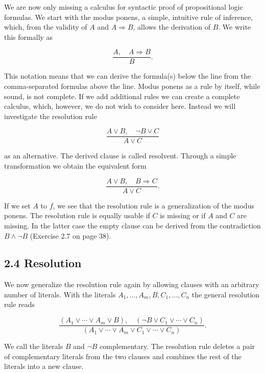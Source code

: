 \documentclass[10pt]{article}
\begin{document}
We are now only missing a calculus for syntactic proof of propositional logic formulas. We start with the modus ponens, a simple, intuitive rule of inference, which, from the validity of $A$ and $A \Rightarrow B$, allows the derivation of $B$. We write this formally as

$$
\frac{A, \quad A \Rightarrow B}{B} .
$$

This notation means that we can derive the formula(s) below the line from the comma-separated formulas above the line. Modus ponens as a rule by itself, while sound, is not complete. If we add additional rules we can create a complete calculus, which, however, we do not wish to consider here. Instead we will investigate the resolution rule


\begin{equation*}
\frac{A \vee B, \quad \neg B \vee C}{A \vee C} \tag{2.1}
\end{equation*}


as an alternative. The derived clause is called resolvent. Through a simple transformation we obtain the equivalent form

$$
\frac{A \vee B, \quad B \Rightarrow C}{A \vee C} .
$$

If we set $A$ to $f$, we see that the resolution rule is a generalization of the modus ponens. The resolution rule is equally usable if $C$ is missing or if $A$ and $C$ are missing. In the latter case the empty clause can be derived from the contradiction $B \wedge \neg B$ (Exercise 2.7 on page 38).

\subsection*{2.4 Resolution}
We now generalize the resolution rule again by allowing clauses with an arbitrary number of literals. With the literals $A_{1}, \ldots, A_{m}, B, C_{1}, \ldots, C_{n}$ the general resolution rule reads


\begin{equation*}
\frac{\left(A_{1} \vee \cdots \vee A_{m} \vee B\right), \quad\left(\neg B \vee C_{1} \vee \cdots \vee C_{n}\right)}{\left(A_{1} \vee \cdots \vee A_{m} \vee C_{1} \vee \cdots \vee C_{n}\right)} . \tag{2.2}
\end{equation*}


We call the literals $B$ and $\neg B$ complementary. The resolution rule deletes a pair of complementary literals from the two clauses and combines the rest of the literals into a new clause.
\end{document}
